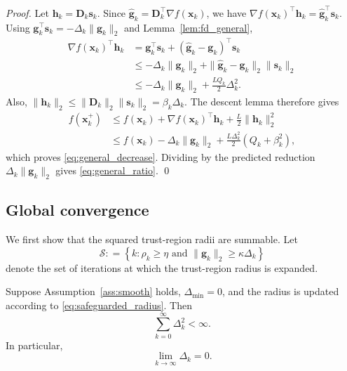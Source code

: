 \documentclass[smallextended]{svjour3}
\newcommand{\bx}{\bm{x}}
\newcommand{\bg}{\bm{g}}
\newcommand{\bs}{\bm{s}}
\providecommand{\coloneqq}{\mathrel{\mathop:}=}
\begin{document}
\begin{proof}
Let $\bm h_k = \bm D_k\bs_k$. Since $\hat{\bg}_k = \bm D_k^\top\nabla f(\bx_k)$, we have $\nabla f(\bx_k)^\top\bm h_k = \hat{\bg}_k^\top\bs_k$. Using $\bg_k^\top\bs_k = -\Delta_k\|\bg_k\|_2$ and Lemma~\ref{lem:fd_general},
\[
\begin{aligned}
\nabla f(\bx_k)^\top\bm h_k &= \bg_k^\top\bs_k + (\hat{\bg}_k-\bg_k)^\top\bs_k \\
&\le -\Delta_k\|\bg_k\|_2 + \|\hat{\bg}_k-\bg_k\|_2\|\bs_k\|_2 \\
&\le -\Delta_k\|\bg_k\|_2 + \frac{LQ_k}{2}\Delta_k^2.
\end{aligned}
\]
Also, $\|\bm h_k\|_2 \le \|\bm D_k\|_2\|\bs_k\|_2 = \beta_k\Delta_k$. The descent lemma therefore gives
\[
\begin{aligned}
f(\bx_k^+) &\le f(\bx_k) + \nabla f(\bx_k)^\top\bm h_k + \frac{L}{2}\|\bm h_k\|_2^2 \\
&\le f(\bx_k) - \Delta_k\|\bg_k\|_2 + \frac{L\Delta_k^2}{2} (Q_k+\beta_k^2),
\end{aligned}
\]
which proves \eqref{eq:general_decrease}. Dividing by the predicted reduction $\Delta_k\|\bg_k\|_2$ gives \eqref{eq:general_ratio}.
\qed
\end{proof}

\subsection{Global convergence}
\label{subsec:global_convergence}

We first show that the squared trust-region radii are summable. Let
\begin{equation}
\label{eq:expansion_set}
\mathcal S \coloneqq \left\{ k : \rho_k\ge\eta \text{ and } \|\bg_k\|_2\ge\kappa\Delta_k \right\}
\end{equation}
denote the set of iterations at which the trust-region radius is expanded.

\begin{lemma}
\label{lem:radius_summability}
\label{lem:radius_decay}
Suppose Assumption~\ref{ass:smooth} holds, $\Delta_{\min}=0$, and the radius is updated according to \eqref{eq:safeguarded_radius}. Then
\begin{equation}
\label{eq:radius_square_summable}
\sum_{k=0}^{\infty}\Delta_k^2 < \infty.
\end{equation}
In particular,
\begin{equation}
\label{eq:radius_to_zero}
\lim_{k\to\infty} \Delta_k = 0.
\end{equation}
\end{lemma}
\end{document}
